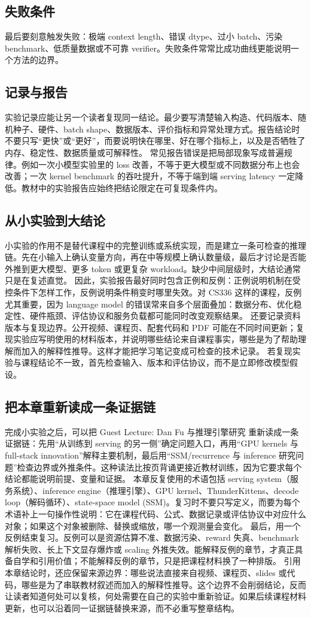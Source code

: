 \documentclass[a4paper]{article}
\begin{document}
\subsection{失败条件}
最后要刻意触发失败：极端 context length、错误 dtype、过小 batch、污染 benchmark、低质量数据或不可靠 verifier。失败条件常常比成功曲线更能说明一个方法的边界。
\subsection{记录与报告}
实验记录应能让另一个读者复现同一结论。最少要写清楚输入构造、代码版本、随机种子、硬件、batch shape、数据版本、评价指标和异常处理方式。报告结论时不要只写“更快”或“更好”，而要说明快在哪里、好在哪个指标上，以及是否牺牲了内存、稳定性、数据质量或可解释性。
常见报告错误是把局部现象写成普遍规律。例如一次小模型实验里的 loss 改善，不等于更大模型或不同数据分布上也会改善；一次 kernel benchmark 的吞吐提升，不等于端到端 serving latency 一定降低。教材中的实验报告应始终把结论限定在可复现条件内。
\subsection{从小实验到大结论}
小实验的作用不是替代课程中的完整训练或系统实现，而是建立一条可检查的推理链。先在小输入上确认变量方向，再在中等规模上确认数量级，最后才讨论是否能外推到更大模型、更多 token 或更复杂 workload。缺少中间层级时，大结论通常只是在复述直觉。
因此，实验报告最好同时包含正例和反例：正例说明机制在受控条件下怎样工作，反例说明条件稍变时哪里失效。对 CS336 这样的课程，反例尤其重要，因为 language model 的错误常来自多个层面叠加：数据分布、优化稳定性、硬件瓶颈、评估协议和服务负载都可能同时改变观察结果。
还要记录资料版本与复现边界。公开视频、课程页、配套代码和 PDF 可能在不同时间更新；复现实验应写明使用的材料版本，并说明哪些结论来自课程事实，哪些是为了帮助理解而加入的解释性推导。这样才能把学习笔记变成可检查的技术记录。
若复现实验与课程结论不一致，首先检查输入、版本和评估协议，而不是立即修改模型假设。
\subsection{把本章重新读成一条证据链}
完成小实验之后，可以把 Guest Lecture: Dan Fu 与推理引擎研究 重新读成一条证据链：先用“从训练到 serving 的另一侧”确定问题入口，再用“GPU kernels 与 full-stack innovation”解释主要机制，最后用“SSM/recurrence 与 inference 研究问题”检查边界或外推条件。这种读法比按页背诵更接近教材训练，因为它要求每个结论都能说明前提、变量和证据。
本章反复使用的术语包括 serving system（服务系统）、inference engine（推理引擎）、GPU kernel、ThunderKittens、decode loop（解码循环）、state-space model (SSM)。复习时不要只写定义，而要为每个术语补上一句操作性说明：它在课程代码、公式、数据记录或评估协议中对应什么对象；如果这个对象被删除、替换或缩放，哪一个观测量会变化。
最后，用一个反例结束复习。反例可以是资源估算不准、数据污染、reward 失真、benchmark 解析失败、长上下文显存爆炸或 scaling 外推失效。能解释反例的章节，才真正具备自学和引用价值；不能解释反例的章节，只是把课程材料换了一种排版。
引用本章结论时，还应保留来源边界：哪些说法直接来自视频、课程页、slides 或代码，哪些是为了串联教材叙述而加入的解释性推导。这个边界不会削弱结论，反而让读者知道何处可以复核，何处需要在自己的实验中重新验证。如果后续课程材料更新，也可以沿着同一证据链替换来源，而不必重写整章结构。
\end{document}
